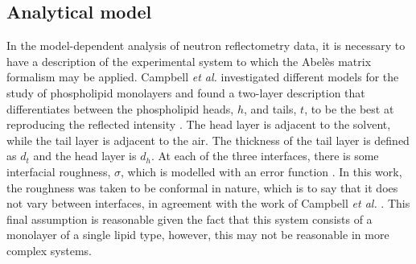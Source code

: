 \documentclass[%
 reprint,
 superscriptaddress,
 amsmath,amssymb,
 aps,
]{revtex4-1}
\begin{document}
\subsection{\label{models} Analytical model}

In the model-dependent analysis of neutron reflectometry data, it is necessary to have a description of the experimental system to which the Abel\`{e}s matrix formalism may be applied. 
Campbell \emph{et al.} investigated different models for the study of phospholipid monolayers and found a two-layer description that differentiates between the phospholipid heads, $h$, and tails, $t$, to be the best at reproducing the reflected intensity \cite{campbell_structure_2018}. 
The head layer is adjacent to the solvent, while the tail layer is adjacent to the air. 
The thickness of the tail layer is defined as $d_t$ and the head layer is $d_h$.
At each of the three interfaces, there is some interfacial roughness, $\sigma$, which is modelled with an error function \cite{nevot_caracterisation_1980}.
In this work, the roughness was taken to be conformal in nature, which is to say that it does not vary between interfaces, in agreement with the work of Campbell \emph{et al.} \cite{campbell_structure_2018}.
This final assumption is reasonable given the fact that this system consists of a monolayer of a single lipid type, however, this may not be reasonable in more complex systems. 
\end{document}
